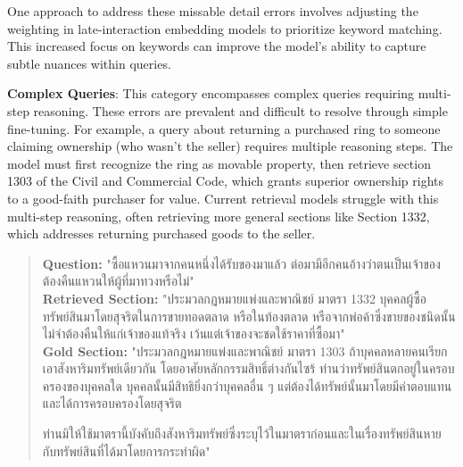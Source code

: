 One approach to address these missable detail errors involves adjusting the weighting in late-interaction embedding models to prioritize keyword matching. This increased focus on keywords can improve the model's ability to capture subtle nuances within queries.


\textbf{Complex Queries}: This category encompasses complex queries requiring multi-step reasoning. These errors are prevalent and difficult to resolve through simple fine-tuning. For example, a query about returning a purchased ring to someone claiming ownership (who wasn't the seller) requires multiple reasoning steps. The model must first recognize the ring as movable property, then retrieve section 1303 of the Civil and Commercial Code, which grants superior ownership rights to a good-faith purchaser for value. Current retrieval models struggle with this multi-step reasoning, often retrieving more general sections like Section 1332, which addresses returning purchased goods to the seller.

\begin{quote}
\begin{thai}
\textbf{Question: } "ซื้อแหวนมาจากคนหนึ่งได้รับของมาแล้ว ต่อมามีอีกคนอ้างว่าตนเป็นเจ้าของ ต้องคืนแหวนให้ผู้ที่มาทวงหรือไม่" \\
\textbf{Retrieved Section: } "ประมวลกฎหมายแพ่งและพาณิชย์ มาตรา 1332
บุคคลผู้ซื้อทรัพย์สินมาโดยสุจริตในการขายทอดตลาด หรือในท้องตลาด หรือจากพ่อค้าซึ่งขายของชนิดนั้น ไม่จำต้องคืนให้แก่เจ้าของแท้จริง เว้นแต่เจ้าของจะชดใช้ราคาที่ซื้อมา" \\
\textbf{Gold Section: } "ประมวลกฎหมายแพ่งและพาณิชย์ มาตรา 1303 ถ้าบุคคลหลายคนเรียกเอาสังหาริมทรัพย์เดียวกัน โดยอาศัยหลักกรรมสิทธิ์ต่างกันไซร้ ท่านว่าทรัพย์สินตกอยู่ในครอบครองของบุคคลใด บุคคลนั้นมีสิทธิยิ่งกว่าบุคคลอื่น ๆ แต่ต้องได้ทรัพย์นั้นมาโดยมีค่าตอบแทนและได้การครอบครองโดยสุจริต

ท่านมิให้ใช้มาตรานี้บังคับถึงสังหาริมทรัพย์ซึ่งระบุไว้ในมาตราก่อนและในเรื่องทรัพย์สินหาย กับทรัพย์สินที่ได้มาโดยการกระทำผิด"
\end{thai}
\end{quote}

